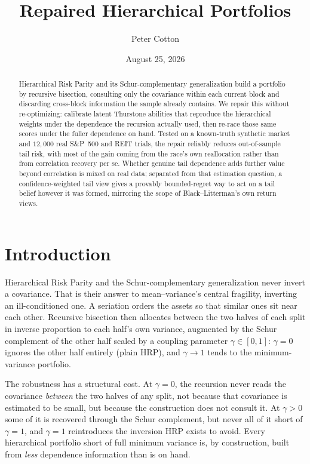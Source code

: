 \documentclass[11pt]{article}
\title{Repaired Hierarchical Portfolios}
\author{Peter Cotton}
\date{August 25, 2026}
\begin{document}
\maketitle

\begin{abstract}
Hierarchical Risk Parity and its Schur-complementary generalization build a
portfolio by recursive bisection, consulting only the covariance within
each current block and discarding cross-block information the sample
already contains. We repair this without re-optimizing: calibrate latent
Thurstone abilities that reproduce the hierarchical weights under the
dependence the recursion actually used, then re-race those same scores
under the fuller dependence on hand. Tested on a known-truth synthetic
market and $12{,}000$ real S\&P~500 and REIT trials, the repair reliably
reduces out-of-sample tail risk, with most of the gain coming from the
race's own reallocation rather than from correlation recovery per se.
Whether genuine tail dependence adds further value beyond correlation is
mixed on real data; separated from that estimation question, a
confidence-weighted tail view gives a provably bounded-regret way to act on
a tail belief however it was formed, mirroring the scope of
Black--Litterman's own return views.
\end{abstract}

\section{Introduction}

Hierarchical Risk Parity \parencite{lopezdeprado2016} and the
Schur-complementary generalization \parencite{cotton2024schur} never invert a
covariance. That is their answer to mean--variance's central fragility,
inverting an ill-conditioned one. A seriation orders the assets so that
similar ones sit near each other. Recursive bisection then allocates between
the two halves of each split in inverse proportion to each half's own
variance, augmented by the Schur complement of the other half scaled by a
coupling parameter $\gamma\in[0,1]$: $\gamma=0$ ignores the other half
entirely (plain HRP), and $\gamma\to1$ tends to the minimum-variance
portfolio.

The robustness has a structural cost. At $\gamma=0$, the recursion never
reads the covariance \emph{between} the two halves of any split, not because
that covariance is estimated to be small, but because the construction does
not consult it. At $\gamma>0$ some of it is recovered through the Schur
complement, but never all of it short of $\gamma=1$, and $\gamma=1$
reintroduces the inversion HRP exists to avoid. Every hierarchical portfolio
short of full minimum variance is, by construction, built from
\emph{less} dependence information than is on hand.
\end{document}
